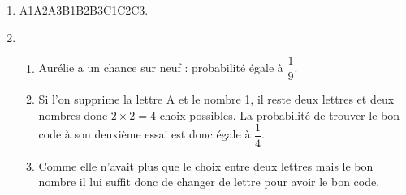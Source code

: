 
\medskip

%
%

\begin{enumerate}
\item %
A1\quad A2\quad A3\quad B1\quad B2\quad B3\quad C1\quad C2\quad C3.
\item %
	\begin{enumerate}
		\item %
Aurélie a un chance sur neuf : probabilité égale à $\dfrac{1}{9}$.
		\item %
		
Si l'on supprime la lettre A et le nombre 1, il reste deux lettres et deux nombres donc $2 \times 2 = 4$ choix possibles. La probabilité  de trouver le bon code à son deuxième essai est donc égale à $\dfrac{1}{4}$.
		\item %
Comme elle n'avait plus que le choix entre deux lettres mais le bon nombre il lui suffit donc de changer de lettre pour avoir le bon code.
	\end{enumerate}
\end{enumerate}

\vspace{0,5cm}

